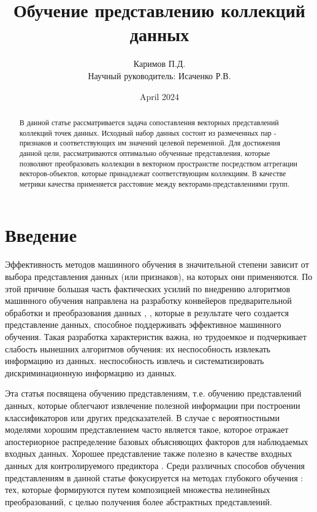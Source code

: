 \documentclass{article}
\title{Обучение представлению коллекций данных}
\author{Каримов П.Д.\\Научный руководитель: Исаченко Р.В.}
\date{April 2024}
\begin{document}
\maketitle

\begin{abstract}
    В данной статье рассматривается задача сопоставления векторных представлений коллекций точек данных. Исходный набор данных состоит из размеченных пар - признаков и соответствующих им значений целевой переменной. Для достижения данной цели, рассматриваются оптимально обученные представления, которые позволяют преобразовать коллекции в векторном пространстве посредством аггрегации векторов-объектов, которые принадлежат соответствующим коллекциям. В качестве метрики качества применяется расстояние между векторами-представлениями групп. 
\end{abstract}

\section{Введение}

Эффективность методов машинного обучения в значительной степени
зависит от выбора представления данных (или признаков),
на которых они применяются. По этой причине большая часть фактических
усилий по внедрению алгоритмов машинного обучения направлена на
разработку конвейеров предварительной обработки и преобразования данных \cite{10.1145/3514221.3517848}, \cite{Li2019PreprocessingMA}, которые
в результате чего создается представление данных, способное поддерживать эффективное
машинного обучения. Такая разработка характеристик важна, но
трудоемкое и подчеркивает слабость нынешних алгоритмов обучения: их неспособность извлекать информацию из данных.
неспособность извлечь и систематизировать дискриминационную информацию из данных.

Эта статья посвящена обучению представлениям, т.е. обучению
представлений данных, которые облегчают извлечение полезной
информации при построении классификаторов или других предсказателей. В случае с вероятностными моделями хорошим представлением часто является
такое, которое отражает апостериорное распределение базовых объясняющих факторов для наблюдаемых входных данных. Хорошее представление также полезно в качестве входных данных для контролируемого предиктора \cite{Devlin2019BERTPO}.
Среди различных способов обучения представлениям в данной статье
фокусируется на методах глубокого обучения \cite{baghaei2022deep}: тех, которые формируются путем
композицией множества нелинейных преобразований, с
целью получения более абстрактных представлений.
\end{document}
